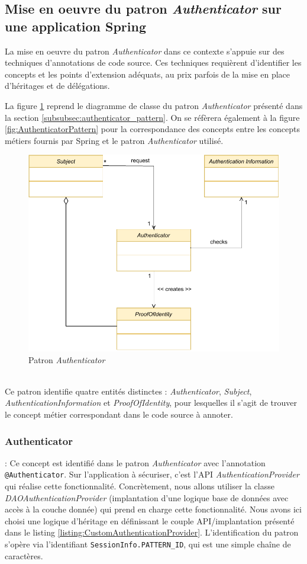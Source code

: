 \subsection{Mise en oeuvre du patron \textit{Authenticator} sur une application Spring}


La mise en oeuvre du patron \textit{Authenticator} dans ce contexte s'appuie sur des techniques d'annotations de code source. Ces techniques requièrent d'identifier les concepts et les points d'extension adéquats, au prix parfois de la mise en place d'héritages et de délégations.

La figure \ref{fig:AuthenticationClassDiagram2} reprend le diagramme de classe du patron \textit{Authenticator} présenté dans la section \ref{subsubsec:authenticator_pattern}. On se réfèrera également à la figure \ref{fig:AuthenticatorPattern} pour la correspondance des concepts entre les concepts métiers fournis par Spring et le patron \textit{Authenticator} utilisé.
\\
\begin{figure}[!h]
    \centering
    \includegraphics[width=0.6 \columnwidth]{figures/AuthenticationClassDiagram.pdf}
    \caption{Patron \textit{Authenticator}}
    \label{fig:AuthenticationClassDiagram2}
\end{figure}
\\

Ce patron identifie quatre entités distinctes : \textit{Authenticator}, \textit{Subject}, \textit{AuthenticationInformation} et \textit{ProofOfIdentity}, pour lesquelles il s'agit de trouver le concept métier correspondant dans le code source à annoter.

\subsubsection{Authenticator} : Ce concept est identifié dans le patron \textit{Authenticator} avec l'annotation \texttt{@Authenticator}. Sur l'application à sécuriser, c'est l'API \textit{AuthenticationProvider} qui réalise cette fonctionnalité. Concrètement, nous allons utiliser la classe \textit{DAOAuthenticationProvider} (implantation d'une logique base de données avec accès à la couche donnée) qui prend en charge cette fonctionnalité. Nous avons ici choisi une logique d'héritage en définissant le couple API/implantation présenté dans le listing \ref{listing:CustomAuthenticationProvider}. L'identification du patron s'opère via l'identifiant \texttt{SessionInfo.PATTERN\_ID}, qui est une simple chaîne de caractères.


